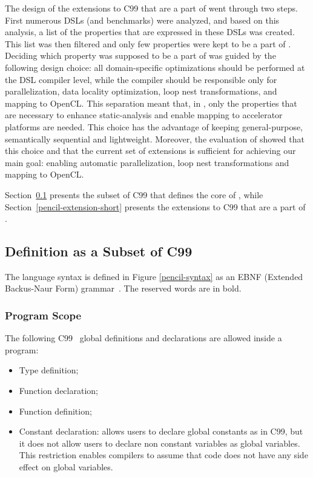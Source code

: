 The design of the extensions to C99 that are a part of \pencil went
through two steps.
First numerous DSLs (and benchmarks) were analyzed, and based on this
analysis,  a list of the properties that are expressed in these DSLs
was created.
This list was then filtered and only few properties were kept to be a
part of \pencil.
Deciding which property was supposed to be a part of \pencil was guided by
the following design choice:
all domain-specific optimizations should be performed at the DSL compiler
level, while the \pencil compiler should be responsible only for parallelization,
data locality optimization, loop nest transformations, and mapping to OpenCL.
This separation meant that, in \pencil, only the properties that are necessary
to enhance static-analysis and enable mapping to accelerator platforms are needed.
This choice has the advantage of keeping \pencil general-purpose,
semantically sequential and lightweight.
Moreover, the evaluation of \pencil showed that this choice and that the
current set of extensions is sufficient for achieving our main goal:
enabling automatic parallelization, loop nest transformations
and mapping to OpenCL.

Section~\ref{pencil-c99-subset} presents the subset of C99 that
defines the core of \pencil, while Section~\ref{pencil-extension-short}
presents the extensions to C99 that are a part of \pencil.

\subsection{\pencil Definition as a Subset of C99}
\label{pencil-c99-subset}
The language syntax is defined in Figure \ref{pencil-syntax} as an EBNF (Extended
Backus-Naur Form) grammar~\cite{wirth1996EBNF}.
The reserved words are in bold.



\subsubsection{Program Scope}
The following C99~\cite{c99} global definitions and declarations are allowed inside a
\pencil program:
\begin{itemize}
  \item Type definition;
  \item Function declaration;
  \item Function definition;
  \item Constant declaration: \pencil allows users to declare global constants
        as in C99, but it does not allow users to declare non constant variables
        as global variables.
        This restriction enables \pencil compilers to
        assume that \pencil code does not have any side effect on global
        variables.
\end{itemize}

